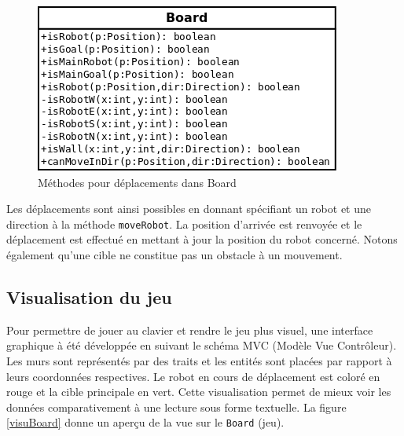 \documentclass[a4paper]{article} %
\begin{document}
\begin{figure}[htpb]
	\begin{center}
	\includegraphics[scale=0.5]{./images/boardMove.png}
	\caption{Méthodes pour déplacements dans Board}
	\end{center}
\end{figure}

Les déplacements sont ainsi possibles en donnant spécifiant un robot et une direction à la méthode \texttt{moveRobot}. La position d'arrivée est renvoyée et le déplacement est effectué en mettant à jour la position du robot concerné. Notons également qu'une cible ne constitue pas un obstacle à un mouvement.

	\subsection{Visualisation du jeu}
Pour permettre de jouer au clavier et rendre le jeu plus visuel, une interface graphique à été développée en suivant le schéma MVC (Modèle Vue Contrôleur). Les murs sont représentés par des traits et les entités sont placées par rapport à leurs coordonnées respectives. Le robot en cours de déplacement est coloré en rouge et la cible principale en vert. Cette visualisation permet de mieux voir les données comparativement à une lecture sous forme textuelle.
La figure \ref{visuBoard} donne un aperçu de la vue sur le \texttt{Board} (jeu).
\end{document}

